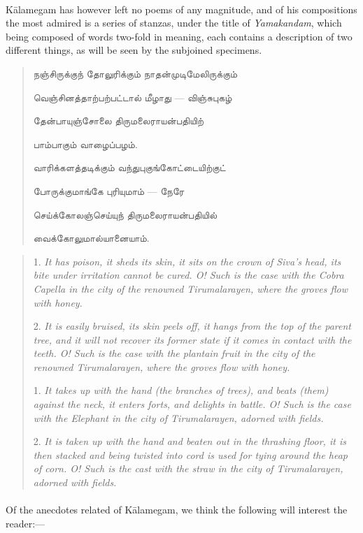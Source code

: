 \documentclass{article}
\newcommand{\TamilText}[1]{\texttamil{#1}}
\newcommand{\tam}[1]{\TamilText{#1}}
\begin{document}
\paragraph{}
K\={a}lamegam has however left no poems of any magnitude, and of his compositions the most admired is a series of stanzas, under the title of \emph{Yamakandam}, which being composed of words two-fold in meaning, each contains a description of two different things, as will be seen by the subjoined specimens.
\begin{quotation}\small
\tam{நஞ்சிருக்குந் தோலுரிக்கும்‌ நாதன்முடிமேலிருக்கும்‌}

\tam{வெஞ்சினத்தாற்பற்பட்டால்‌ மீழாது} --- \tam{விஞ்சுபுகழ்‌}

\tam{தேன்பாயுஞ்சோலை திருமலைராயன்பதியிற்‌}

\tam{பாம்பாகும்‌ வாழைப்பழம்‌}.

\bigskip

\tam{வாரிக்களத்தடிக்கும்‌ வந்துபுகுங்கோட்டையிற்குட்‌}

\tam{போருக்குமாங்கே புரியுமாம்‌} --- \tam{நேரே}

\tam{செய்க்கோலஞ்செய்யுந்‌ திருமலைராயன்பதியில்‌}

\tam{வைக்கோலுமால்யானையாம்‌}.
\end{quotation}
\begin{quotation}\small
1. \emph{It has poison, it sheds its skin, it sits on the crown of Siva's head, its bite under irritation cannot be cured. O! Such is the case with the Cobra Capella in the city of the renowned Tirumalarayen, where the groves flow with honey.}

2. \emph{It is easily bruised, its skin peels off, it hangs from the top of the parent tree, and it will not recover its former state if it comes in contact with the teeth. O! Such is the case with the plantain fruit in the city of the renowned Tirumalarayen, where the groves flow with honey.}

1. \emph{It takes up with the hand (the branches of trees), and beats (them) against the neck, it enters forts, and delights in battle. O! Such is the case with the Elephant in the city of Tirumalarayen, adorned with fields.}

2. \emph{It is taken up with the hand and beaten out in the thrashing floor, it is then stacked and being twisted into cord is used for tying around the heap of corn. O! Such is the cast with the straw in the city of Tirumalarayen, adorned with fields.}
\end{quotation}
\paragraph{}
Of the anecdotes related of K\={a}lamegam, we think the following will interest the reader:---
\end{document}
